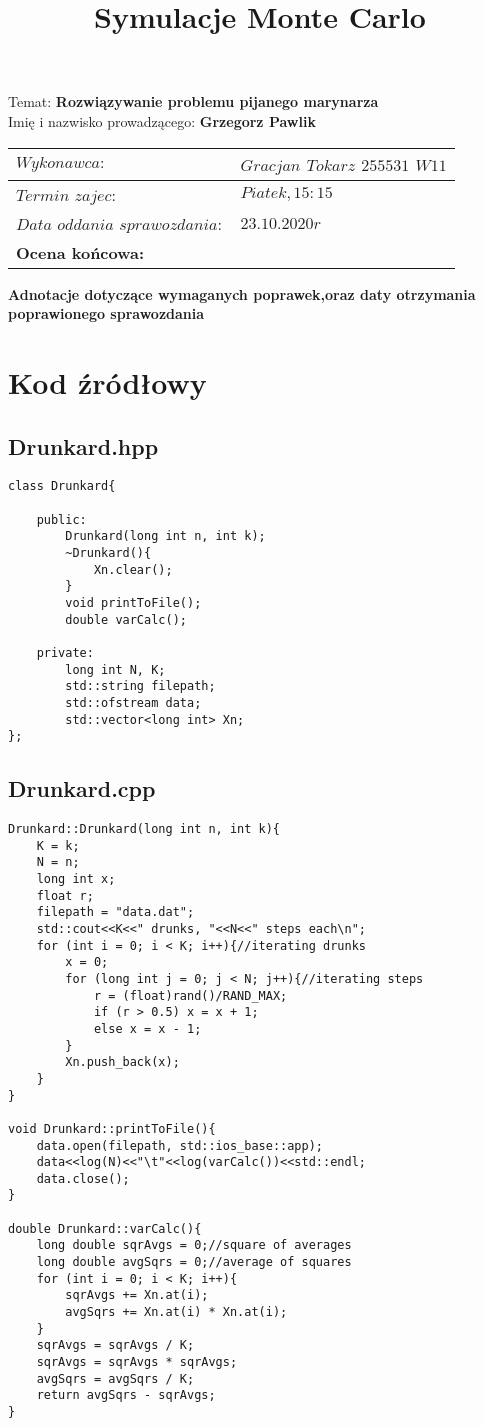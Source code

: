 \documentclass{article}
\title{Symulacje Monte Carlo}
\date{}
\begin{document}
\maketitle
Temat: \textbf{Rozwiązywanie problemu pijanego marynarza}\\
Imię i nazwisko prowadzącego: \textbf{Grzegorz Pawlik}

\begin{center}
\begin{tabular}{|p{5cm}|p{6cm}|}
\hline
$Wykonawca:$ & $Gracjan$ $Tokarz$ $255531$ $W11$  \\
\hline
$Termin$ $zajec:$ & $Piatek , 15:15$\\
\hline
$Data$ $oddania$ $sprawozdania:$ & $23.10.2020r$\\
\hline
\textbf{Ocena	końcowa:} & \\
\hline
\end{tabular}
\end{center}

\textbf{Adnotacje dotyczące wymaganych poprawek,oraz daty otrzymania poprawionego sprawozdania}

\newpage

\section{Kod źródłowy}
\subsection{Drunkard.hpp}
\lstset{
	language=C++
}
\begin{lstlisting}
class Drunkard{

	public:
		Drunkard(long int n, int k);
		~Drunkard(){
			Xn.clear();
		}
		void printToFile();
		double varCalc();

	private:
		long int N, K;
		std::string filepath;
		std::ofstream data;
		std::vector<long int> Xn;
};
\end{lstlisting}

\subsection{Drunkard.cpp}
\begin{lstlisting}
Drunkard::Drunkard(long int n, int k){
	K = k;
	N = n;
	long int x;
	float r;
	filepath = "data.dat";
	std::cout<<K<<" drunks, "<<N<<" steps each\n";
	for (int i = 0; i < K; i++){//iterating drunks
		x = 0;
		for (long int j = 0; j < N; j++){//iterating steps
			r = (float)rand()/RAND_MAX;
			if (r > 0.5) x = x + 1;
			else x = x - 1;
		}
		Xn.push_back(x);
	}
}

void Drunkard::printToFile(){
	data.open(filepath, std::ios_base::app);
	data<<log(N)<<"\t"<<log(varCalc())<<std::endl;
	data.close();
}

double Drunkard::varCalc(){
	long double sqrAvgs = 0;//square of averages
	long double avgSqrs = 0;//average of squares
	for (int i = 0; i < K; i++){
		sqrAvgs += Xn.at(i);
		avgSqrs += Xn.at(i) * Xn.at(i);
	}
	sqrAvgs = sqrAvgs / K;
	sqrAvgs = sqrAvgs * sqrAvgs;
	avgSqrs = avgSqrs / K;
	return avgSqrs - sqrAvgs;
}
\end{lstlisting}
\end{document}
